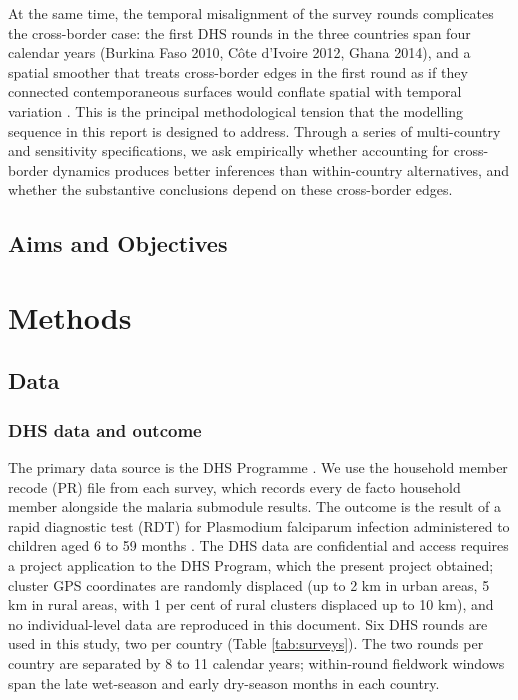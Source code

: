 \documentclass{article}
\begin{document}
At the same time, the temporal misalignment of the survey rounds
complicates the cross-border case: the first DHS rounds in the three
countries span four calendar years (Burkina Faso 2010, Côte d'Ivoire
2012, Ghana 2014), and a spatial smoother that treats cross-border edges
in the first round as if they connected contemporaneous surfaces would
conflate spatial with temporal variation \citep{saldarriaga2020}. This
is the principal methodological tension that the modelling sequence in
this report is designed to address. Through a series of multi-country
and sensitivity specifications, we ask empirically whether accounting
for cross-border dynamics produces better inferences than within-country
alternatives, and whether the substantive conclusions depend on these
cross-border edges.

\subsection{Aims and Objectives}\label{aims-and-objectives}

\section{Methods}\label{methods}

\label{sec:methods}

\subsection{Data}\label{data}

\subsubsection{DHS data and outcome}\label{dhs-data-and-outcome}

\label{sec:dhs} The primary data source is the DHS Programme
\citep{croft2018}. We use the household member recode (PR) file from
each survey, which records every de facto household member alongside the
malaria submodule results. The outcome is the result of a rapid
diagnostic test (RDT) for Plasmodium falciparum infection administered
to children aged 6 to 59 months \citep{florey2014}. The DHS data are
confidential and access requires a project application to the DHS
Program, which the present project obtained; cluster GPS coordinates are
randomly displaced (up to 2 km in urban areas, 5 km in rural areas, with
1 per cent of rural clusters displaced up to 10 km), and no
individual-level data are reproduced in this document. Six DHS rounds
are used in this study, two per country (Table \ref{tab:surveys}). The
two rounds per country are separated by 8 to 11 calendar years;
within-round fieldwork windows span the late wet-season and early
dry-season months in each country.
\end{document}
